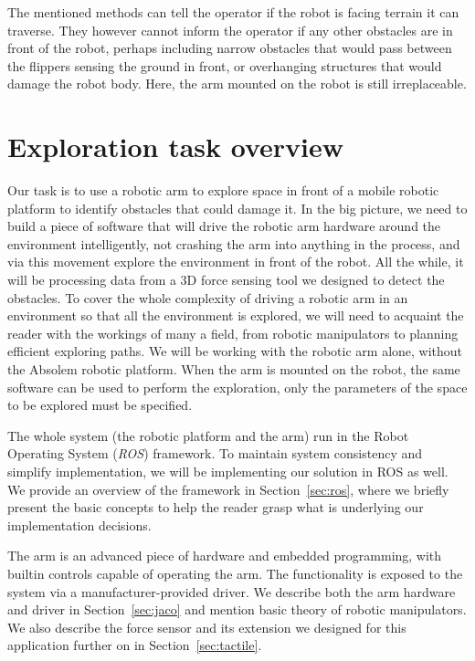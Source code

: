 \documentclass[buriama8_dp.tex]{subfiles}
\begin{document}
The mentioned methods can tell the operator if the robot is facing terrain it can traverse. They however cannot inform the operator if any other obstacles are in front of the robot, perhaps including narrow obstacles that would pass between the flippers sensing the ground in front, or overhanging structures that would damage the robot body. Here, the arm mounted on the robot is still irreplaceable.

\section{Exploration task overview}
\label{sec:label}

Our task is to use a robotic arm to explore space in front of a mobile robotic platform to identify obstacles that could damage it. In the big picture, we need to build a piece of software that will drive the robotic arm hardware around the environment intelligently, not crashing the arm into anything in the process, and via this movement explore the environment in front of the robot. All the while, it will be processing data from a 3D force sensing tool we designed to detect the obstacles. To cover the whole complexity of driving a robotic arm in an environment so that all the environment is explored, we will need to acquaint the reader with the workings of many a field, from robotic manipulators to planning efficient exploring paths. We will be working with the robotic arm alone, without the Absolem robotic platform. When the arm is mounted on the robot, the same software can be used to perform the exploration, only the parameters of the space to be explored must be specified.

The whole system (the robotic platform and the arm) run in the Robot Operating System (\emph{ROS}) framework. To maintain system consistency and simplify implementation, we will be implementing our solution in ROS as well. We provide an overview of the framework in Section~\ref{sec:ros}, where we briefly present the basic concepts to help the reader grasp what is underlying our implementation decisions.

The arm is an advanced piece of hardware and embedded programming, with builtin controls capable of operating the arm. The functionality is exposed to the system via a manufacturer-provided driver. We describe both the arm hardware and driver in Section~\ref{sec:jaco} and mention basic theory of robotic manipulators. We also describe the force sensor and its extension we designed for this application further on in Section~\ref{sec:tactile}. 
\end{document}
